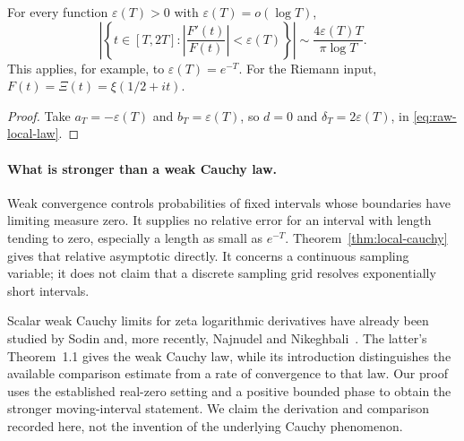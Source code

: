 \begin{corollary}
\label{cor:rare-flatness}
For every function $\varepsilon(T)>0$ with
$\varepsilon(T)=o(\log T)$,
\begin{equation}\label{eq:near-stationarity}
 \boxed{\displaystyle
 \left|\left\{t\in[T,2T]:
           \left|\frac{F'(t)}{F(t)}\right|<\varepsilon(T)\right\}\right|
        \sim\frac{4\varepsilon(T)T}{\pi\log T}.}
\end{equation}
This applies, for example, to $\varepsilon(T)=e^{-T}$.
For the Riemann input, $F(t)=\Xi(t)=\xi(1/2+it)$.
\end{corollary}
\begin{proof}
Take $a_T=-\varepsilon(T)$ and $b_T=\varepsilon(T)$, so $d=0$ and
$\delta_T=2\varepsilon(T)$, in \eqref{eq:raw-local-law}.
\end{proof}

\paragraph{What is stronger than a weak Cauchy law.}
Weak convergence controls probabilities of fixed intervals whose
boundaries have limiting measure zero.  It supplies no relative error
for an interval with length tending to zero, especially a length as
small as $e^{-T}$.  Theorem~\ref{thm:local-cauchy} gives that relative
asymptotic directly.  It concerns a continuous sampling variable; it
does not claim that a discrete sampling grid resolves exponentially
short intervals.

Scalar weak Cauchy limits for zeta logarithmic derivatives have already
been studied by Sodin and, more recently, Najnudel and
Nikeghbali~\cite{sodin,najnudel}.  The latter's Theorem~1.1 gives the
weak Cauchy law, while its introduction distinguishes the available
comparison estimate from a rate of convergence to that law.  Our
proof uses the established real-zero setting and a positive bounded
phase to obtain the stronger moving-interval statement.  We claim
the derivation and comparison recorded here, not the invention of
the underlying Cauchy phenomenon.

